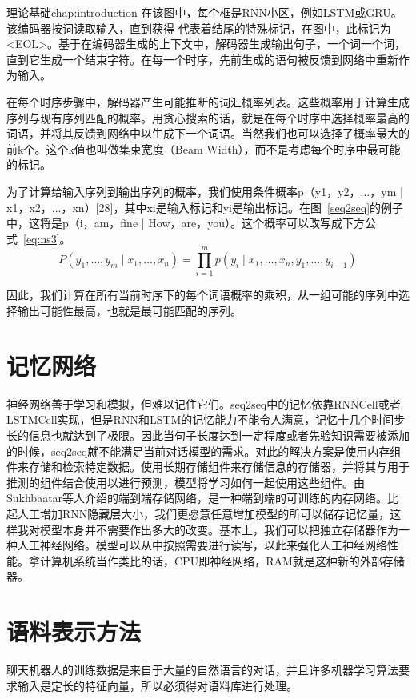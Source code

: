 \begin{cuzchapter}{理论基础}{chap:introduction}
在该图中，每个框是RNN小区，例如LSTM或GRU。该编码器按词读取输入，直到获得
代表着结尾的特殊标记，在图中，此标记为<EOL>。基于在编码器生成的上下文中，解码器生成输出句子，一个词一个词，直到它生成一个结束字符。在每一个时序，先前生成的语句被反馈到网络中重新作为输入。

在每个时序步骤中，解码器产生可能推断的词汇概率列表。这些概率用于计算生成序列与现有序列匹配的概率。用贪心搜索的话，就是在每个时序中选择概率最高的词语，并将其反馈到网络中以生成下一个词语\cite{Sutskever2014Sequence}。当然我们也可以选择了概率最大的前k个。这个k值也叫做集束宽度（Beam Width），而不是考虑每个时序中最可能的标记。

为了计算给输入序列到输出序列的概率，我们使用条件概率p（y1，y2，...，ym | x1，x2，...，xn）[28]，其中xi是输入标记和yi是输出标记。在图~\ref{seq2seq}的例子中，这将是p（i，am，fine | How，are，you）。这个概率可以改写成下方公式~\ref{eq:ns3}。
\begin{equation}
    \label{eq:ns3}
    P( y_{1},\ldots ,y_{m}\mid x_{1},\ldots ,x_{n}) = \prod ^{m}_{i=1}p( y_{i}\mid x_{1},\ldots ,x_{n},y_{1},\ldots ,y_{i-1} )   
\end{equation}

因此，我们计算在所有当前时序下的每个词语概率的乘积，从一组可能的序列中选择输出可能性最高，也就是最可能匹配的序列。
\section{记忆网络}\label{sec:background}
神经网络善于学习和模拟，但难以记住它们。seq2seq中的记忆依靠RNNCell或者LSTMCell实现，但是RNN和LSTM的记忆能力不能令人满意，记忆十几个时间步长的信息也就达到了极限。因此当句子长度达到一定程度或者先验知识需要被添加的时候，seq2seq就不能满足当前对话模型的需求。对此的解决方案是使用内存组件来存储和检索特定数据。使用长期存储组件来存储信息的存储器，并将其与用于推测的组件结合使用以进行预测，模型将学习如何一起使用这些组件。由Sukhbaatar等人介绍的端到端存储网络\cite{Perez2016Gated}，是一种端到端的可训练的内存网络。比起人工增加RNN隐藏层大小，我们更愿意任意增加模型的所可以储存记忆量，这样我对模型本身并不需要作出多大的改变。基本上，我们可以把独立存储器作为一种人工神经网络。模型可以从中按照需要进行读写，以此来强化人工神经网络性能。拿计算机系统当作类比的话，CPU即神经网络，RAM就是这种新的外部存储器。
\section{语料表示方法}\label{sec:background}
聊天机器人的训练数据是来自于大量的自然语言的对话，并且许多机器学习算法要求输入是定长的特征向量\cite{Le2014Distributed}，所以必须得对语料库进行处理。


\end{cuzchapter}
